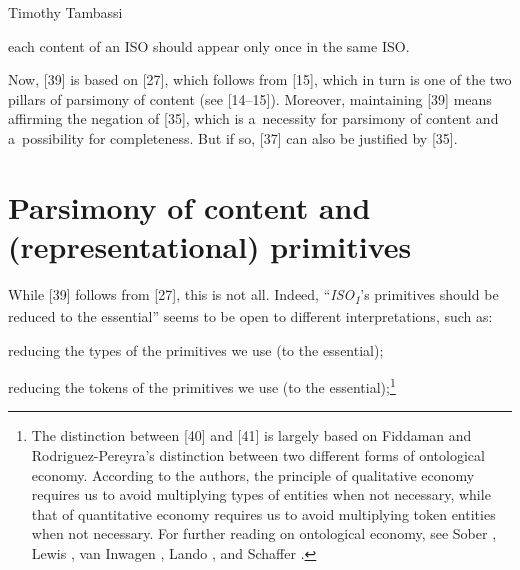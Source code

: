 \begin{artengenv}{Timothy Tambassi}
\begin{enumerate}[label={[\arabic*]}]
\item each content of an ISO should appear only once in the same ISO.

\end{enumerate}

Now, [39] is based on [27], which follows from [15], which in turn is one of the two pillars of parsimony of content (see [14–15]). Moreover, maintaining [39] means affirming the negation of [35], which is a~necessity for parsimony of content and a~possibility for completeness. But if so, [37] can also be justified by [35].



\section{Parsimony of content and (representational) primitives}

While [39] follows from [27], this is not all. Indeed, ``\textit{ISO}\textit{\textsubscript{1}}'s primitives should be reduced to the essential'' seems to be open to different interpretations, such as:



\setcounter{saveenumtambassi}{\value{enumi}}

\begin{enumerate}[label={[\arabic*]}]

\setcounter{enumi}{\value{saveenumtambassi}}

\item reducing the types of the primitives we use (to the essential);

\item reducing the tokens of the primitives we use (to the essential);\footnote{The distinction between [40] and [41] is largely based on Fiddaman and Rodriguez-Pereyra's 
\parencite*[][]{fiddaman_razor_2018} %
distinction between two different forms of ontological economy. According to the authors, the principle of qualitative economy requires us to avoid multiplying types of entities when not necessary, while that of quantitative economy requires us to avoid multiplying token entities when not necessary. For further reading on ontological economy, see Sober 
\parencite*[][]{sober_simplicity_1975}, %
 Lewis 
\parencite*[][]{lewis_counterfactuals_1973}, %
 van Inwagen 
\parencite*[][]{van_inwagen_ontology_2001}, %
 Lando 
\parencite*[][]{lando_ontologia_2010}, %
 and Schaffer 
\parencite*[][]{schaffer_what_2015}.%
}



\end{enumerate}
\end{artengenv}
